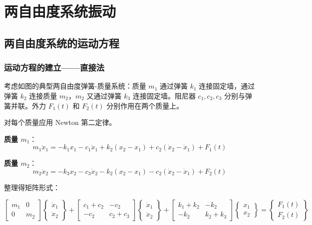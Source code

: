 \chapter{两自由度系统振动}

\section{两自由度系统的运动方程}

\subsection{运动方程的建立——直接法}

考虑如图的典型两自由度弹簧-质量系统：质量 $m_1$ 通过弹簧 $k_1$ 连接固定墙，通过弹簧 $k_2$ 连接质量 $m_2$，$m_2$ 又通过弹簧 $k_3$ 连接固定墙。阻尼器 $c_1, c_2, c_3$ 分别与弹簧并联。外力 $F_1(t)$ 和 $F_2(t)$ 分别作用在两个质量上。

对每个质量应用 Newton 第二定律。

\textbf{质量 $m_1$}：
\[
m_1\ddot{x}_1 = -k_1 x_1 - c_1 \dot{x}_1 + k_2(x_2 - x_1) + c_2(\dot{x}_2 - \dot{x}_1) + F_1(t)
\]

\textbf{质量 $m_2$}：
\[
m_2\ddot{x}_2 = -k_3 x_2 - c_3 \dot{x}_2 - k_2(x_2 - x_1) - c_2(\dot{x}_2 - \dot{x}_1) + F_2(t)
\]

整理得矩阵形式：

\begin{myformula}
\[
\begin{bmatrix} m_1 & 0 \\ 0 & m_2 \end{bmatrix} 
\begin{Bmatrix} \ddot{x}_1 \\ \ddot{x}_2 \end{Bmatrix} + 
\begin{bmatrix} c_1 + c_2 & -c_2 \\ -c_2 & c_2 + c_3 \end{bmatrix} 
\begin{Bmatrix} \dot{x}_1 \\ \dot{x}_2 \end{Bmatrix} + 
\begin{bmatrix} k_1 + k_2 & -k_2 \\ -k_2 & k_2 + k_3 \end{bmatrix} 
\begin{Bmatrix} x_1 \\ x_2 \end{Bmatrix} = 
\begin{Bmatrix} F_1(t) \\ F_2(t) \end{Bmatrix}
\]
\end{myformula}

